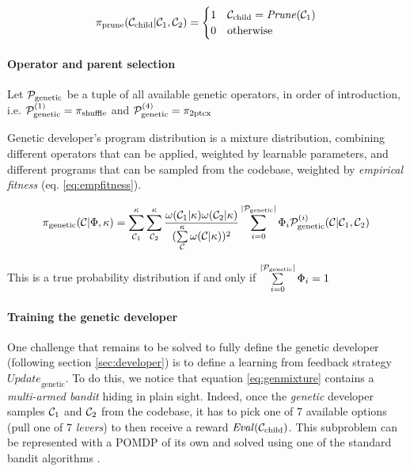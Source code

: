 \begin{equation}
    \pi_\text{prune}(\mathcal{C}_\text{child}|\mathcal{C}_1,\mathcal{C}_2)= \begin{cases}
        1 & \mathcal{C}_\text{child} = \mathit{Prune}(\mathcal{C}_1) \\
        0 & \text{otherwise}
        \end{cases}
\end{equation}

\newpage
\paragraph{Operator and parent selection}

Let $\mathcal{P}_\text{genetic}$ be a tuple of all available genetic operators, in order of introduction, i.e. $\mathcal{P}_\text{genetic}^{(1)}=\pi_\text{shuffle}$ and $\mathcal{P}_\text{genetic}^{(4)}=\pi_\text{2ptcx}$

Genetic developer's program distribution is a mixture distribution, combining different operators that can be applied, weighted by learnable parameters, and different programs that can be sampled from the codebase, weighted by \emph{empirical fitness} (eq. \ref{eq:empfitness}).

\begin{equation}
    \pi_\text{genetic}(\mathcal{C} | \Phi, \kappa) = 
    \sum\limits_{\mathcal{C}_1}^{\kappa}  
    \sum\limits_{\mathcal{C}_2}^{\kappa} 
    \frac{\omega(\mathcal{C}_1|\kappa) \omega(\mathcal{C}_2|\kappa)}{(\sum\limits_{\mathcal{C}}^{\kappa} \omega(\mathcal{C}|\kappa))^2} 
    \sum\limits_{i=0}^{|\mathcal{P}_\text{genetic}|} 
    \Phi_i \mathcal{P}_\text{genetic}^{(i)} (\mathcal{C}|\mathcal{C}_1,\mathcal{C}_2)
    \label{eq:genmixture}
\end{equation}

This is a true probability distribution if and only if $\sum\limits_{i=0}^{|\mathcal{P}_\text{genetic}|} 
    \Phi_i = 1$


\paragraph{Training the genetic developer}

One challenge that remains to be solved to fully define the genetic developer (following section \ref{sec:developer}) is to define a learning from feedback strategy $\mathit{Update}_\text{genetic}$.
To do this, we notice that equation \ref{eq:genmixture} contains a \emph{multi-armed bandit} \cite{banditproblem} hiding in plain sight.
Indeed, once the \emph{genetic} developer samples $\mathcal{C}_1$ and $\mathcal{C}_2$ from the codebase, it has to pick one of 7 available options (pull one of 7 \emph{levers}) to then receive a reward $\mathit{Eval}(\mathcal{C}_\text{child})$.
This subproblem can be represented with a POMDP of its own and solved using one of the standard bandit algorithms \cite{banditsolutions}.

